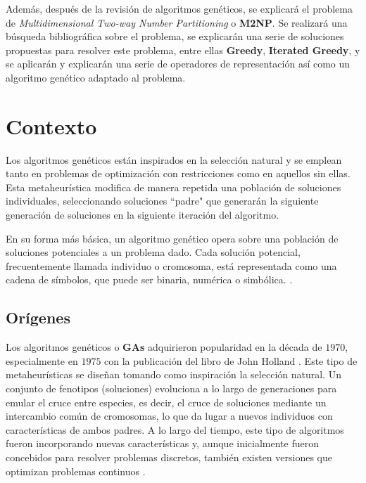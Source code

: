 \documentclass[12pt,letterpaper]{article}
\begin{document}
Además, después de la revisión de algoritmos genéticos, se explicará el problema de \textit{Multidimensional Two-way Number Partitioning} o \textbf{M2NP}. Se realizará una búsqueda bibliográfica sobre el problema, se explicarán una serie de soluciones propuestas para resolver este problema, entre ellas \textbf{Greedy}, \textbf{Iterated Greedy}, y se aplicarán y explicarán una serie de operadores de representación así como un algoritmo genético adaptado al problema.

\section{Contexto}
Los algoritmos genéticos están inspirados en la selección natural y se emplean tanto en problemas de optimización con restricciones como en aquellos sin ellas. Esta metaheurística modifica de manera repetida una población de soluciones individuales, seleccionando soluciones ``padre" que generarán la siguiente generación de soluciones en la siguiente iteración del algoritmo.

En su forma más básica, un algoritmo genético opera sobre una población de soluciones potenciales a un problema dado. Cada solución potencial, frecuentemente llamada individuo o cromosoma, está representada como una cadena de símbolos, que puede ser binaria, numérica o simbólica. \cite{10.5555/522098}.

\subsection{Orígenes}
Los algoritmos genéticos o \textbf{GAs} adquirieron popularidad en la década de $1970$, especialmente en $1975$ con la publicación del libro de John Holland \cite{Holland:1975}. Este tipo de metaheurísticas se diseñan tomando como inspiración la selección natural. Un conjunto de fenotipos (soluciones) evoluciona a lo largo de generaciones para emular el cruce entre especies, es decir, el cruce de soluciones mediante un intercambio común de cromosomas, lo que da lugar a nuevos individuos con características de ambos padres. A lo largo del tiempo, este tipo de algoritmos fueron incorporando nuevas características y, aunque inicialmente fueron concebidos para resolver problemas discretos, también existen versiones que optimizan problemas continuos \cite{eiben2015}.
\end{document}
